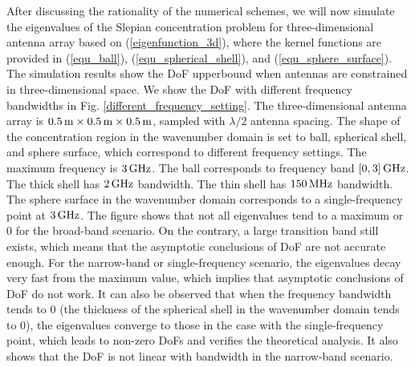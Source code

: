 \documentclass[12pt,draftclsnofoot,journal,onecolumn]{IEEEtran}
\begin{document}
	{\color{red} After discussing the rationality of the numerical schemes, we will now} simulate the eigenvalues of the Slepian concentration problem for three-dimensional antenna array based on (\ref{eigenfunction_3d}), where the kernel functions are provided in (\ref{equ_ball}), (\ref{equ_spherical_shell}), and (\ref{equ_sphere_surface}). The simulation results show the DoF upperbound when antennas are constrained in three-dimensional space.
	We show the DoF with different frequency bandwidths in Fig. \ref{different_frequency_setting}. The three-dimensional antenna array is $0.5\,{\rm m} \times 0.5\,{\rm m} \times 0.5\,{\rm m}$, sampled with $\lambda/2$ antenna spacing. The shape of the concentration region in the wavenumber domain is set to ball, spherical shell, and sphere surface, which correspond to different frequency settings.
	The maximum frequency is $3\,{\rm GHz}$. The ball corresponds to frequency band $[0,3]\,{\rm GHz}$. The thick shell has $2\,{\rm GHz}$ bandwidth. The thin shell has $150\,{\rm MHz}$ bandwidth. The sphere surface in the wavenumber domain corresponds to a single-frequency point at $3\,{\rm GHz}$. The figure shows that not all eigenvalues tend to a maximum or 0 for the broad-band scenario. On the contrary, a large transition band still exists, which means that the asymptotic conclusions of DoF are not accurate enough. For the narrow-band or single-frequency scenario, the eigenvalues decay very fast from the maximum value, which implies that asymptotic conclusions of DoF do not work.
	It can also be observed that when the frequency bandwidth tends to 0 (the thickness of the spherical shell in the wavenumber domain tends to 0), the eigenvalues converge to those in the case with the single-frequency point, which leads to non-zero DoFs and verifies the theoretical analysis. It also shows that the DoF is not linear with bandwidth in the narrow-band scenario.
	 
\end{document}
